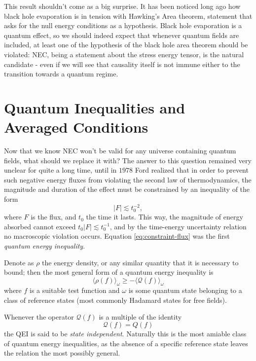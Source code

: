 This result shouldn't come as a big surprise. It has been noticed long ago how black hole evaporation is in tension with Hawking's Area theorem, statement that asks for the null energy conditions as a hypothesis. Black hole evaporation is a quantum effect, so we should indeed expect that whenever quantum fields are included, at least one of the hypothesis of the black hole area theorem should be violated: NEC, being a statement about the stress energy tensor, is the natural candidate - even if we will see that causality itself is not immune either to the transition towards a quantum regime.

\section{Quantum Inequalities and Averaged Conditions}
Now that we know NEC won't be valid for any universe containing quantum fields, what should we replace it with? The answer to this question remained very unclear for quite a long time, until in \(1978\) Ford \cite[]{ford1978quantum} realized that in order to prevent such negative energy fluxes from violating the second law of thermodynamics, the magnitude and duration of the effect must be constrained by an inequality of the form
\begin{equation}
    \label{eq:constraint-flux}
    \vert F \vert \lesssim t_0^{-2},    
\end{equation}
where \(F\) is the flux, and \(t_0\) the time it lasts. This way, the magnitude of energy absorbed cannot exceed \(t_0\vert F\vert \lesssim t_0^{-1}\), and by the time-energy uncertainty relation no macroscopic violation occurs. Equation \eqref{eq:constraint-flux} was the first \emph{quantum energy inequality}. 

Denote as \(\rho\) the energy density, or any similar quantity that it is necessary to bound; then the most general form of a quantum energy inequality is 
\[
\langle \rho(f) \rangle_{\omega} \ge - \langle \mathcal{Q}(f) \rangle_{\omega}   
\]
where \(f\) is a suitable test function and \(\omega\) is some quantum state belonging to a class of reference states (most commonly Hadamard states for free fields).

Whenever the operator \(\mathcal{Q}(f) \) is a multiple of the identity 
\[
    \mathcal{Q}(f) = Q(f)    
\]
the QEI is said to be \emph{state independent}. Naturally this is the most amiable class of quantum energy inequalities, as the absence of a specific reference state leaves the relation the most possibly general.

